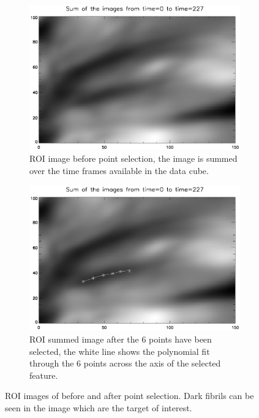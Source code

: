 \documentclass[11pt]{article}
\begin{document}
\begin{figure}[t!]
\centering
\begin{subfigure}{7cm}
\includegraphics[scale=0.47, clip=true, viewport=1.5cm 1cm 18cm 13cm]{firstplot}
\caption{ROI image before point selection, the image is summed over the time frames available in the data cube.\tiny}
\label{firstplot}
\end{subfigure}
\hfill    
\begin{subfigure}{7cm}
\includegraphics[scale=0.47, clip=true, viewport=1.5cm 1cm 18cm 13cm]{secondplot}
\caption{ROI summed image after the 6 points have been selected, the white line shows the polynomial fit through the 6 points across the axis of the selected feature.\tiny}
\label{secondplot}
\end{subfigure}
\caption{ROI images of before and after point selection. Dark fibrils can be seen in the image which are the target of interest.\tiny}
\end{figure}
\end{document}
